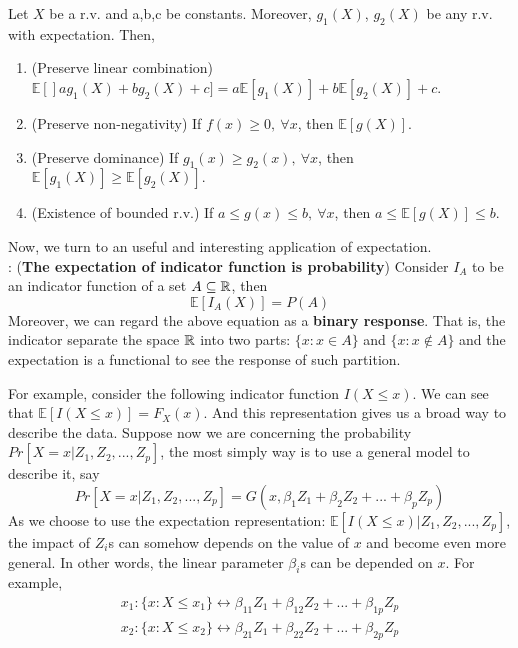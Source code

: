 \documentclass[../Transformation.tex]{subfiles}
\begin{document}
\begin{property}
	Let $X$ be a r.v. and a,b,c be constants. Moreover, $g_1(X)$, $g_2(X)$ be any r.v. with expectation. Then,
	\begin{enumerate}
		\item (Preserve linear combination) $\mathbb{E}[]ag_1(X)+bg_2(X)+c]=a\mathbb{E}[g_1(X)] + b\mathbb{E}[g_2(X)] + c$.
		\item (Preserve non-negativity) If $f(x)\geq0,\ \forall x$, then $\mathbb{E}[g(X)]$.
		\item (Preserve dominance) If $g_1(x)\geq g_2(x),\ \forall x$, then $\mathbb{E}[g_1(X)]\geq\mathbb{E}[g_2(X)].$
		\item (Existence of bounded r.v.) If $a\leq g(x) \leq b,\ \forall x$, then $a\leq \mathbb{E}[g(X)]\leq b.$
	\end{enumerate}
\end{property}

Now, we turn to an useful and interesting application of expectation.\\

: ({\bf The expectation of indicator function is probability})
Consider $I_A$ to be an indicator function of a set $A\subseteq{\mathbb R}$, then
$$\mathbb{E}[I_A(X)] = P(A)$$
Moreover, we can regard the above equation as a {\bf binary response}. That is, the indicator separate the space ${\mathbb R}$ into two parts: $\{x:x\in A\}$ and $\{x:x\notin A \}$ and the expectation is a functional to see the response of such partition.

For example, consider the following indicator function $I(X\leq x)$. We can see that $\mathbb{E}[I(X\leq x)] = F_X(x)$. And this representation gives us a broad way to describe the data. Suppose now we are concerning the probability $Pr[X=x|Z_1,Z_2,...,Z_p]$, the most simply way is to use a general model to describe it, say
$$Pr[X=x|Z_1,Z_2,...,Z_p] = G(x,\beta_1Z_1+\beta_2Z_2+...+\beta_pZ_p)$$
As we choose to use the expectation representation: $\mathbb{E}[I(X\leq x)|Z_1,Z_2,...,Z_p]$, the impact of $Z_i$s can somehow depends on the value of $x$ and become even more general. In other words, the linear parameter $\beta_i$s can be depended on $x$. For example,
\begin{align*}
x_1: \{x:X\leq x_1 \}\leftrightarrow \beta_{11}Z_1+\beta_{12}Z_2+...+\beta_{1p}Z_p\\
x_2: \{x:X\leq x_2 \}\leftrightarrow \beta_{21}Z_1+\beta_{22}Z_2+...+\beta_{2p}Z_p
\end{align*}
\end{document}
